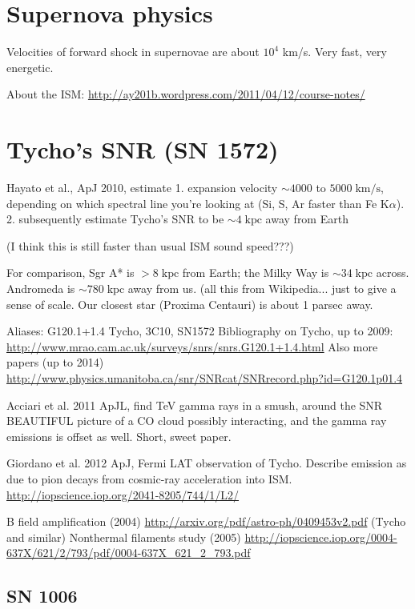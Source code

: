 \documentclass[10pt]{article}
\newcommand{\mt}{\mathrm}
\newcommand{\unit}[1]{\; \mt{#1}} %
\newcommand{\abt}{\mathord{\sim}} %
\begin{document}
\section{Supernova physics}
Velocities of forward
shock in supernovae are about $10^4$ km/s.  Very fast, very energetic.

About the ISM:
\href{notes}{http://ay201b.wordpress.com/2011/04/12/course-notes/}

\section{Tycho's SNR (SN 1572)}

Hayato et al., ApJ 2010, estimate
1. expansion velocity $\abt 4000$ to $5000 \unit{km/s}$, depending on which
spectral line you're looking at (Si, S, Ar faster than Fe K$\alpha$).
2. subsequently estimate Tycho's SNR to be $\abt 4 \unit{kpc}$ away from Earth

(I think this is still faster than usual ISM sound speed???)

For comparison, Sgr A* is $>8\unit{kpc}$ from Earth; the Milky Way is $\abt 34
\unit{kpc}$ across.  Andromeda is $\abt 780 \unit{kpc}$ away from us. (all this
from Wikipedia... just to give a sense of scale.  Our closest star (Proxima
Centauri) is about 1 parsec away.

Aliases: G120.1+1.4 Tycho, 3C10, SN1572
Bibliography on Tycho, up to 2009:
\href{Green's SNR catalogue}
{http://www.mrao.cam.ac.uk/surveys/snrs/snrs.G120.1+1.4.html}
Also more papers (up to 2014) \href{here}
{http://www.physics.umanitoba.ca/snr/SNRcat/SNRrecord.php?id=G120.1p01.4}

Acciari et al. 2011 ApJL, find TeV gamma rays in a smush, around the SNR
BEAUTIFUL picture of a CO cloud possibly interacting, and the gamma ray
emissions is offset as well.  Short, sweet paper.

Giordano et al. 2012 ApJ, Fermi LAT observation of Tycho.
Describe emission as due to pion decays from cosmic-ray acceleration into ISM.
\href{iop}{http://iopscience.iop.org/2041-8205/744/1/L2/}

B field amplification (2004)
\href{arxiv}{http://arxiv.org/pdf/astro-ph/0409453v2.pdf}
(Tycho and similar)
Nonthermal filaments study (2005)
\href{iop}{http://iopscience.iop.org/0004-637X/621/2/793/pdf/0004-637X\_621\_2\_793.pdf}

\subsection{SN 1006}
\end{document}
